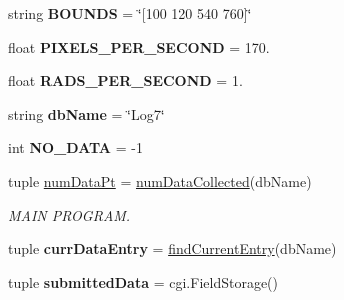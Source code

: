 \begin{DoxyCompactItemize}
\item 
\hypertarget{namespacerobot_server_a193a0d6781cf0093e98c7b36169addb1}{string {\bfseries B\+O\+U\+N\+D\+S} = \char`\"{}\mbox{[}100 120 540 760\mbox{]}\char`\"{}}\label{namespacerobot_server_a193a0d6781cf0093e98c7b36169addb1}

\item 
\hypertarget{namespacerobot_server_ad2f129668335024d3019624b40472488}{float {\bfseries P\+I\+X\+E\+L\+S\+\_\+\+P\+E\+R\+\_\+\+S\+E\+C\+O\+N\+D} = 170.}\label{namespacerobot_server_ad2f129668335024d3019624b40472488}

\item 
\hypertarget{namespacerobot_server_a80d5879703e1ad20c3bbf30a4945e8b8}{float {\bfseries R\+A\+D\+S\+\_\+\+P\+E\+R\+\_\+\+S\+E\+C\+O\+N\+D} = 1.}\label{namespacerobot_server_a80d5879703e1ad20c3bbf30a4945e8b8}

\item 
\hypertarget{namespacerobot_server_a867eb9453324936fd8236a0a757e621c}{string {\bfseries db\+Name} = \char`\"{}Log7\char`\"{}}\label{namespacerobot_server_a867eb9453324936fd8236a0a757e621c}

\item 
\hypertarget{namespacerobot_server_a36b9708bc1a3e2a2812554ee1fec6573}{int {\bfseries N\+O\+\_\+\+D\+A\+T\+A} = -\/1}\label{namespacerobot_server_a36b9708bc1a3e2a2812554ee1fec6573}

\item 
\hypertarget{namespacerobot_server_a10f4b52c046a14e0cbd2ed9febf21b46}{tuple \hyperlink{namespacerobot_server_a10f4b52c046a14e0cbd2ed9febf21b46}{num\+Data\+Pt} = \hyperlink{namespacerobot_server_a75eae201dbb88551a95cbc983d659353}{num\+Data\+Collected}(db\+Name)}\label{namespacerobot_server_a10f4b52c046a14e0cbd2ed9febf21b46}

\begin{DoxyCompactList}\small\item\em M\+A\+I\+N P\+R\+O\+G\+R\+A\+M. \end{DoxyCompactList}\item 
\hypertarget{namespacerobot_server_a0481a58d7cf1e68320dc24c40deb90ca}{tuple {\bfseries curr\+Data\+Entry} = \hyperlink{namespacerobot_server_acee1413bacea5205a3e924fe474d9ddb}{find\+Current\+Entry}(db\+Name)}\label{namespacerobot_server_a0481a58d7cf1e68320dc24c40deb90ca}

\item 
\hypertarget{namespacerobot_server_a9863d268973dedc72e91bb5edcbd661b}{tuple {\bfseries submitted\+Data} = cgi.\+Field\+Storage()}\label{namespacerobot_server_a9863d268973dedc72e91bb5edcbd661b}


\end{DoxyCompactItemize}
